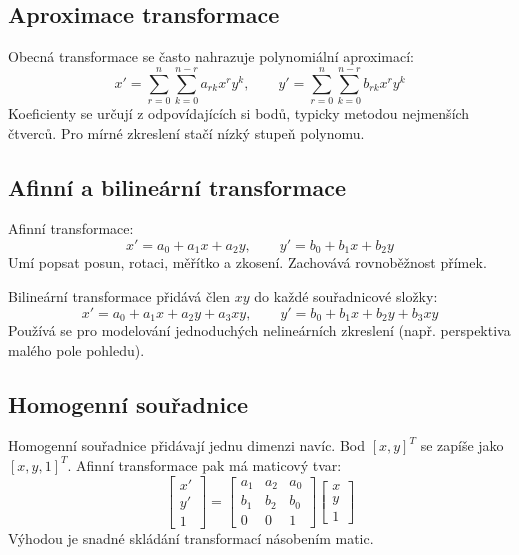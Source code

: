 \subsection*{Aproximace transformace}
Obecná transformace se často nahrazuje polynomiální aproximací:
\begin{equation}
    x'=\sum_{r=0}^{n}\sum_{k=0}^{n-r}a_{rk}x^r y^k,\qquad
    y'=\sum_{r=0}^{n}\sum_{k=0}^{n-r}b_{rk}x^r y^k
\end{equation}
Koeficienty se určují z odpovídajících si bodů, typicky metodou nejmenších čtverců.
Pro mírné zkreslení stačí nízký stupeň polynomu.

\subsection*{Afinní a bilineární transformace}
Afinní transformace:
\begin{equation}
    x'=a_0+a_1x+a_2y,\qquad y'=b_0+b_1x+b_2y
\end{equation}
Umí popsat posun, rotaci, měřítko a zkosení. Zachovává rovnoběžnost přímek.

Bilineární transformace přidává člen \(xy\) do každé souřadnicové složky:
\begin{equation}
    x'=a_0+a_1x+a_2y+a_3xy,\qquad y'=b_0+b_1x+b_2y+b_3xy
\end{equation}
Používá se pro modelování jednoduchých nelineárních zkreslení (např. perspektiva malého pole pohledu).

\subsection*{Homogenní souřadnice}
Homogenní souřadnice přidávají jednu dimenzi navíc. Bod \([x,y]^T\) se zapíše jako \([x,y,1]^T\).
Afinní transformace pak má maticový tvar:
\begin{equation}
    \begin{bmatrix}
        x'\\y'\\1
    \end{bmatrix}
    =
    \begin{bmatrix}
        a_1&a_2&a_0\\
        b_1&b_2&b_0\\
        0&0&1
    \end{bmatrix}
    \begin{bmatrix}
        x\\y\\1
    \end{bmatrix}
\end{equation}
Výhodou je snadné skládání transformací násobením matic.

